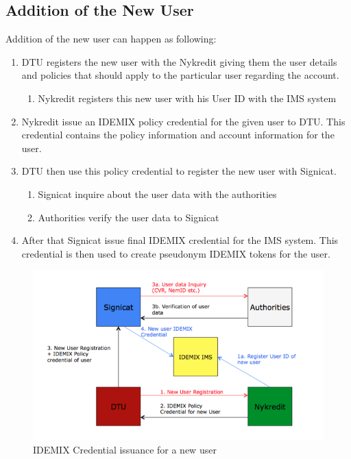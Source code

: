 \subsection{Addition of the New User}
Addition of the new user can happen as following:
\begin{enumerate}
	\item DTU registers the new user with the Nykredit giving them the user details and policies that should apply to the particular user regarding the account. 
	\begin{enumerate}
		\item Nykredit registers this new user with his User ID with the IMS system
	\end{enumerate}
	\item Nykredit issue an IDEMIX policy credential for the given user to DTU. This credential contains the policy information and account information for the user.
	\item DTU then use this policy credential to register the new user with Signicat. 
	\begin{enumerate}
		\item Signicat inquire about the user data with the authorities
		\item Authorities verify the user data to Signicat
	\end{enumerate}
	\item After that Signicat issue final IDEMIX credential for the IMS system. This credential is then used to create pseudonym IDEMIX tokens for the user. 
\end{enumerate}
\begin{figure}[h]
	\centering
	\includegraphics[width=\textwidth]{figures/Real}
	\caption{IDEMIX Credential issuance for a new user}
	\label{fig:Real}
\end{figure}

